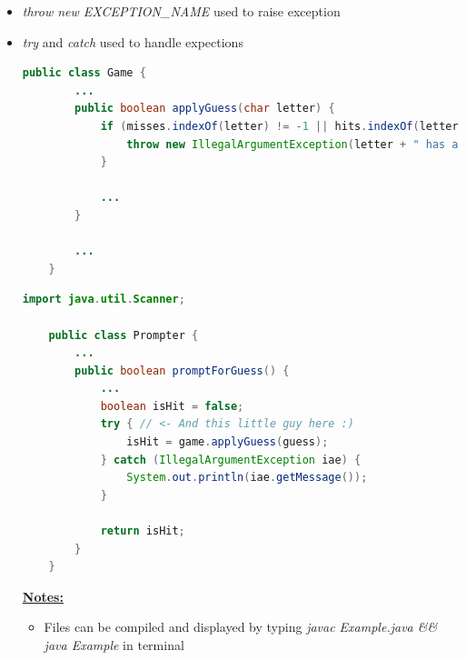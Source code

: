 \documentclass[12pt]{article}
\begin{document}
\begin{itemize}
    \item \textit{throw new EXCEPTION\_NAME} used to raise exception
    \item \textit{try} and \textit{catch} used to handle expections

    \begin{lstlisting}[language=Java,caption={lesson\_01/Game.java}]
    public class Game {
        ...
        public boolean applyGuess(char letter) {
            if (misses.indexOf(letter) != -1 || hits.indexOf(letter) != -1) {
                throw new IllegalArgumentException(letter + " has already been guessed"); // <- this little guy here :)
            }

            ...
        }

        ...
    }
    \end{lstlisting}

    \begin{lstlisting}[language=Java,caption={lesson\_01/Prompter.java}]
    import java.util.Scanner;

    public class Prompter {
        ...
        public boolean promptForGuess() {
            ...
            boolean isHit = false;
            try { // <- And this little guy here :)
                isHit = game.applyGuess(guess);
            } catch (IllegalArgumentException iae) {
                System.out.println(iae.getMessage());
            }

            return isHit;
        }
    }
    \end{lstlisting}

    \bigskip

    \underline{\textbf{Notes:}}

    \bigskip

    \begin{itemize}
        \item Files can be compiled and displayed by typing \textit{javac Example.java \&\& java Example}
        in terminal
    \end{itemize}
\end{itemize}
\end{document}
